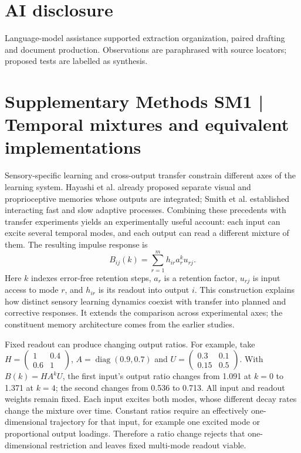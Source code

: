 \documentclass[11pt,a4paper]{article}
\begin{document}
\section{AI disclosure}
Language-model assistance supported extraction organization, paired drafting and document production. Observations are paraphrased with source locators; proposed tests are labelled as synthesis.
\clearpage\section{Supplementary Methods SM1 | Temporal mixtures and equivalent implementations}

Sensory-specific learning and cross-output transfer constrain different axes of the learning system. Hayashi et al. already proposed separate visual and proprioceptive memories whose outputs are integrated; Smith et al. established interacting fast and slow adaptive processes. Combining these precedents with transfer experiments yields an experimentally useful account: each input can excite several temporal modes, and each output can read a different mixture of them. The resulting impulse response is
\begin{equation}B_{ij}(k)=\sum_{r=1}^{m}h_{ir}a_r^k u_{rj}.\label{eq:worked}\end{equation}
Here $k$ indexes error-free retention steps, $a_r$ is a retention factor, $u_{rj}$ is input access to mode $r$, and $h_{ir}$ is its readout into output $i$. This construction explains how distinct sensory learning dynamics coexist with transfer into planned and corrective responses. It extends the comparison across experimental axes; the constituent memory architecture comes from the earlier studies. \cite{hayashi2020,smith2006,wagner2008,maeda2020}

Fixed readout can produce changing output ratios. For example, take $H=\left(\begin{smallmatrix}1&0.4\\0.6&1\end{smallmatrix}\right)$, $A=\operatorname{diag}(0.9,0.7)$ and $U=\left(\begin{smallmatrix}0.3&0.1\\0.15&0.5\end{smallmatrix}\right)$. With $B(k)=HA^kU$, the first input's output ratio changes from 1.091 at $k=0$ to 1.371 at $k=4$; the second changes from 0.536 to 0.713. All input and readout weights remain fixed. Each input excites both modes, whose different decay rates change the mixture over time. Constant ratios require an effectively one-dimensional trajectory for that input, for example one excited mode or proportional output loadings. Therefore a ratio change rejects that one-dimensional restriction and leaves fixed multi-mode readout viable.
\end{document}
